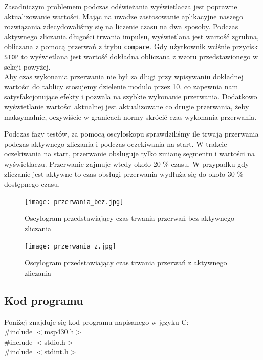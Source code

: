 \documentclass[a4paper,titlepage,11pt,floatssmall]{mwrep}
\begin{document}
\indent Zasadniczym problemem podczas odświeżania wyświetlacza jest poprawne aktualizowanie wartości. Mając na uwadze zastosowanie aplikacyjne naszego rozwiązania zdecydowaliśmy się na liczenie czasu na dwa sposoby. Podczas aktywnego zliczania długości trwania impulsu, wyświetlana jest wartość zgrubna, obliczana z pomocą przerwań z trybu \texttt{compare}. Gdy użytkownik wciśnie przycisk \texttt{STOP} to wyświetlana jest wartość dokładna obliczana z wzoru przedstawionego w sekcji powyżej. \\
 
\indent Aby czas wykonania przerwania nie był za długi przy wpisywaniu dokładnej wartości do tablicy stosujemy dzielenie modulo przez 10, co zapewnia nam satysfakcjonujące efekty i pozwala na szybkie wykonanie przerwania. Dodatkowo wyświetlanie wartości aktualnej jest aktualizowane co drugie przerwania, żeby maksymalnie, oczywiście w granicach normy skrócić czas wykonania przerwania. 

Podczas fazy testów, za pomocą oscyloskopu sprawdziliśmy ile trwają przerwania podczas aktywnego zliczania i podczas oczekiwania na start. W trakcie oczekiwania na start, przerwanie obsługuje tylko zmianę segmentu i wartości na wyświetlaczu. Przerwanie zajmuje wtedy około 20 \%  czasu. W przypadku gdy zliczanie jest aktywne to czas obsługi przerwania wydłuża się do około 30 \% dostępnego czasu.
 
\newpage

\begin{figure}[H]
\centering
\texttt{[image: przerwania\_bez.jpg]}
\caption{Oscylogram przedstawiający czas trwania przerwań bez aktywnego zliczania}
\end{figure}

\bigskip

\begin{figure}[H]
\centering
\texttt{[image: przerwania\_z.jpg]}
\caption{Oscylogram przedstawiający czas trwania przerwań z aktywnego zliczania}
\end{figure}


\newpage
\subsection{Kod programu}
\noindent
Poniżej znajduje się kod programu napisanego w języku C:\\

\noindent\#include $<$msp430.h$>$\\
\#include $<$stdio.h$>$\\
\#include $<$stdint.h$>$\\
\end{document}
